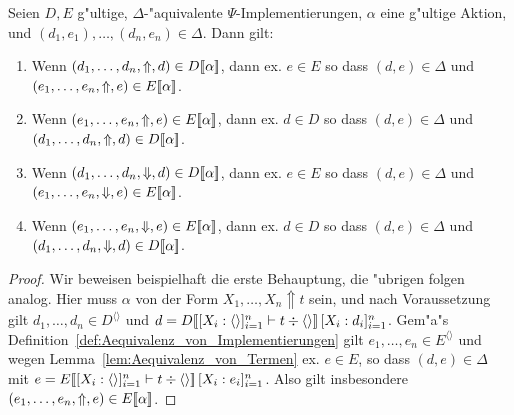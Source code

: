 \documentclass[%
  12pt,%
  a4paper,%
]{article}
\newcommand{\Tj}[3]{{#1}\vdash{#2}\div{#3}}
\begin{document}
\begin{lemma} \label{lem:Aequivalenz_von_Aktionen}
  Seien $D, E$ g"ultige, $\Delta$-"aquivalente $\Psi$-Implementierungen, $\alpha$ eine
  g"ultige Aktion, und $(d_1,e_1),\ldots,(d_n,e_n) \in \Delta$. Dann gilt:
  \begin{enumerate}
  \item Wenn $(d_1,\ldots,d_n,\Uparrow,d) \in D[\![\alpha]\!]$, dann ex. $e \in E$ so dass
    $(d,e) \in \Delta$ und $(e_1,\ldots,e_n,\Uparrow,e) \in E[\![\alpha]\!]$.
  \item Wenn $(e_1,\ldots,e_n,\Uparrow,e) \in E[\![\alpha]\!]$, dann ex. $d \in D$ so dass
    $(d,e) \in \Delta$ und $(d_1,\ldots,d_n,\Uparrow,d) \in D[\![\alpha]\!]$.
  \item Wenn $(d_1,\ldots,d_n,\Downarrow,d) \in D[\![\alpha]\!]$, dann ex. $e \in E$ so dass
    $(d,e) \in \Delta$ und $(e_1,\ldots,e_n,\Downarrow,e) \in E[\![\alpha]\!]$.
  \item Wenn $(e_1,\ldots,e_n,\Downarrow,e) \in E[\![\alpha]\!]$, dann ex. $d \in D$ so dass
    $(d,e) \in \Delta$ und $(d_1,\ldots,d_n,\Downarrow,d) \in D[\![\alpha]\!]$.
  \end{enumerate}
\end{lemma}

\begin{proof}
  Wir beweisen beispielhaft die erste Behauptung, die "ubrigen folgen analog.
  Hier muss $\alpha$ von der Form $X_1,\ldots,X_n \Uparrow t$ sein, und nach Voraussetzung
  gilt $d_1,\ldots,d_n \in D^{\langle \rangle}$ und
  $d = D\sem{\Tj{[X_i:\langle\rangle]_{i=1}^n}{t}{\langle \rangle}}\,[X_i:d_i]_{i=1}^n$.
  Gem"a"s Definition~\ref{def:Aequivalenz_von_Implementierungen} gilt $e_1,\ldots,e_n \in E^{\langle \rangle}$
  und wegen Lemma~\ref{lem:Aequivalenz_von_Termen} ex. $e \in E$, so dass
  $(d,e) \in \Delta$ mit $e = E\sem{\Tj{[X_i:\langle\rangle]_{i=1}^n}{t}{\langle \rangle}}\,[X_i:e_i]_{i=1}^n$.
  Also gilt insbesondere $(e_1,\ldots,e_n,\Uparrow,e) \in E[\![\alpha]\!]$.
\end{proof}
\end{document}
